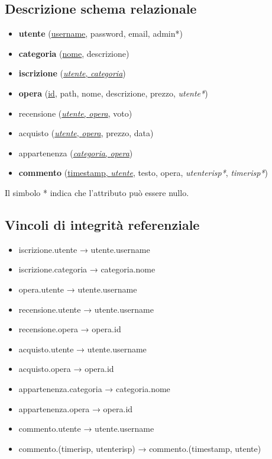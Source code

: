 \documentclass[10pt]{article}
\begin{document}
\subsection{Descrizione schema relazionale}
\begin{itemize}
    \item \textbf{utente} (\underline{username}, password, email, admin*)
    \item \textbf{categoria} (\underline{nome}, descrizione)
    \item \textbf{iscrizione} (\underline{\textit{utente}, \textit{categoria}})
    \item \textbf{opera} (\underline{id}, path, nome, descrizione, prezzo, \textit{utente*})
    \item recensione (\underline{\textit{utente}, \textit{opera}}, voto)
    \item acquisto (\underline{\textit{utente}, \textit{opera}}, prezzo, data)
    \item appartenenza (\underline{\textit{categoria}, \textit{opera}})
    \item \textbf{commento} (\underline{timestamp, \textit{utente}}, testo, opera, \textit{utenterisp*}, \textit{timerisp*})
\end{itemize}
Il simbolo * indica che l'attributo può essere nullo.

\subsection{Vincoli di integrità referenziale }
\begin{itemize}
    \item iscrizione.utente → utente.username
    \item iscrizione.categoria → categoria.nome
    \item opera.utente → utente.username
    \item recensione.utente → utente.username
    \item recensione.opera → opera.id
    \item acquisto.utente → utente.username
    \item acquisto.opera → opera.id
    \item appartenenza.categoria → categoria.nome
    \item appartenenza.opera → opera.id
    \item commento.utente → utente.username
    \item commento.(timerisp, utenterisp) → commento.(timestamp, utente)
\end{itemize}
\end{document}
